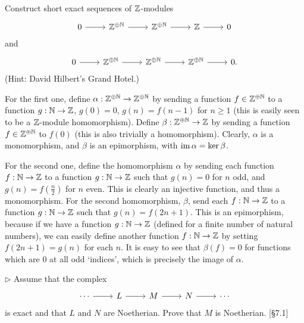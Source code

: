 \begin{problem}
	Construct short exact sequences of $\mathbb{Z}$-modules
	\[
		\begin{tikzcd}
			0
			\arrow[r]
			& \Zs^{\oplus \N}
			\arrow[r]
			& \Zs^{\oplus \N}
			\arrow[r]
			& \Zs
			\arrow[r]
			& 0
		\end{tikzcd}
	\]
	and
	\[
		\begin{tikzcd}
			0
			\arrow[r]
			& \Zs^{\oplus \N}
			\arrow[r]
			& \Zs^{\oplus \N}
			\arrow[r]
			& \Zs^{\oplus \N}
			\arrow[r]
			& 0 \text{.}
		\end{tikzcd}
	\]
	(Hint: David Hilbert's Grand Hotel.)
\end{problem}

\begin{solution}
	For the first one, define $\alpha: \mathbb{Z}^{\oplus \mathbb{N}} \to \mathbb{Z}^{\oplus \mathbb{N}}$ by sending a function $f \in \mathbb{Z}^{\oplus \mathbb{N}}$ to a function $g: \mathbb{N} \to \mathbb{Z}$, $g(0) = 0$, $g(n) = f(n-1)$ for $n \geq 1$ (this is easily seen to be a $\mathbb{Z}$-module homomorphism). Define $\beta: \mathbb{Z}^{\oplus \mathbb{N}} \to \mathbb{Z}$ by sending a function $f \in \mathbb{Z}^{\oplus \mathbb{N}}$ to $f(0)$ (this is also trivially a homomorphism). Clearly, $\alpha$ is a monomorphism, and $\beta$ is an epimorphism, with $\operatorname{im} \alpha = \ker \beta$.
	
	For the second one, define the homomorphism $\alpha$ by sending each function $f: \mathbb{N} \to \mathbb{Z}$ to a function $g: \mathbb{N} \to \mathbb{Z}$ such that $g(n) = 0$ for $n$ odd, and $g(n) = f(\frac{n}{2})$ for $n$ even. This is clearly an injective function, and thus a monomorphism. For the second homomorphism, $\beta$, send each $f: \mathbb{N} \to \mathbb{Z}$ to a function $g: \mathbb{N} \to \mathbb{Z}$ such that $g(n) = f(2n+1)$. This is an epimorphism, because if we have a function $g: \mathbb{N} \to \mathbb{Z}$ (defined for a finite number of natural numbers), we can easily define another function $f: \mathbb{N} \to \mathbb{Z}$ by setting $f(2n+1) = g(n)$ for each $n$. It is easy to see that $\beta(f) = 0$ for functions which are $0$ at all odd `indices', which is precisely the image of $\alpha$.
\end{solution}

\begin{problem}
	$\triangleright$ Assume that the complex
	\[
		\begin{tikzcd}
			\cdots
			\arrow[r]
			& L
			\arrow[r]
			& M
			\arrow[r]
			& N
			\arrow[r]
			& \cdots
		\end{tikzcd}
	\]
	is exact and that $L$ and $N$ are Noetherian. Prove that $M$ is Noetherian. [\S 7.1]
\end{problem}

